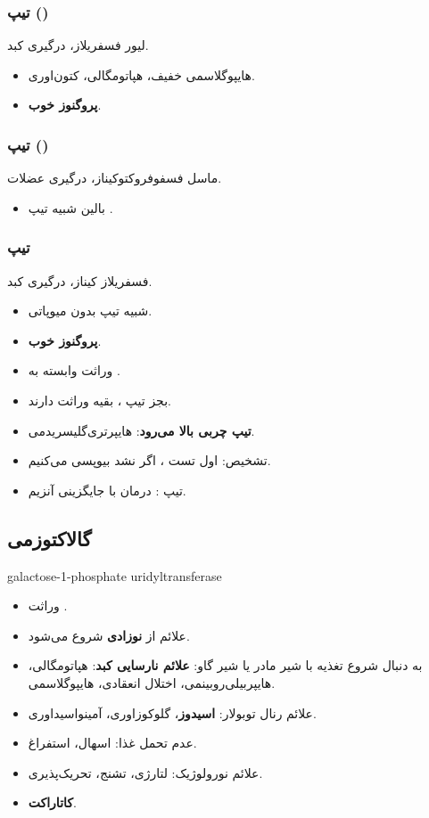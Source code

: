 \documentclass[12pt,a4paper]{article}
\begin{document}
\subsubsection*{تیپ  ()}
لیور فسفریلاز، درگیری کبد.
\begin{itemize}
\item هایپوگلاسمی خفیف، هپاتومگالی، کتون‌اوری.
\item \textbf{پروگنوز خوب}.
\end{itemize}

\subsubsection*{تیپ  ()}
ماسل فسفوفروکتوکیناز، درگیری عضلات.
\begin{itemize}
\item بالین شبیه تیپ .
\end{itemize}

\subsubsection*{تیپ }
فسفریلاز کیناز، درگیری کبد.
\begin{itemize}
\item شبیه تیپ  بدون میوپاتی.
\item \textbf{پروگنوز خوب}.
\item وراثت وابسته به .
\end{itemize}

\begin{itemize}
\item بجز تیپ ، بقیه وراثت \textbf{} دارند.
\item \textbf{تیپ  چربی بالا می‌رود}: هایپرتری‌گلیسریدمی.
\item تشخیص: اول تست ، اگر نشد بیوپسی می‌کنیم.
\item تیپ : درمان با جایگزینی آنزیم.
\end{itemize}

\subsection*{گالاکتوزمی}
\begin{latin}
galactose-1-phosphate uridyltransferase
\end{latin}
\begin{itemize}
\item وراثت \textbf{}.
\item علائم از \textbf{نوزادی} شروع می‌شود.
\item به دنبال شروع تغذیه با شیر مادر یا شیر گاو: \textbf{علائم نارسایی کبد}: هپاتومگالی، هایپربیلی‌روبینمی، اختلال انعقادی، هایپوگلاسمی.
\item علائم رنال توبولار: \textbf{اسیدوز}، گلوکوزاوری، آمینواسیداوری.
\item عدم تحمل غذا: اسهال، استفراغ.
\item علائم نورولوژیک: لتارژی، تشنج، تحریک‌پذیری.
\item \textbf{کاتاراکت}.
\end{itemize}
\end{document}
